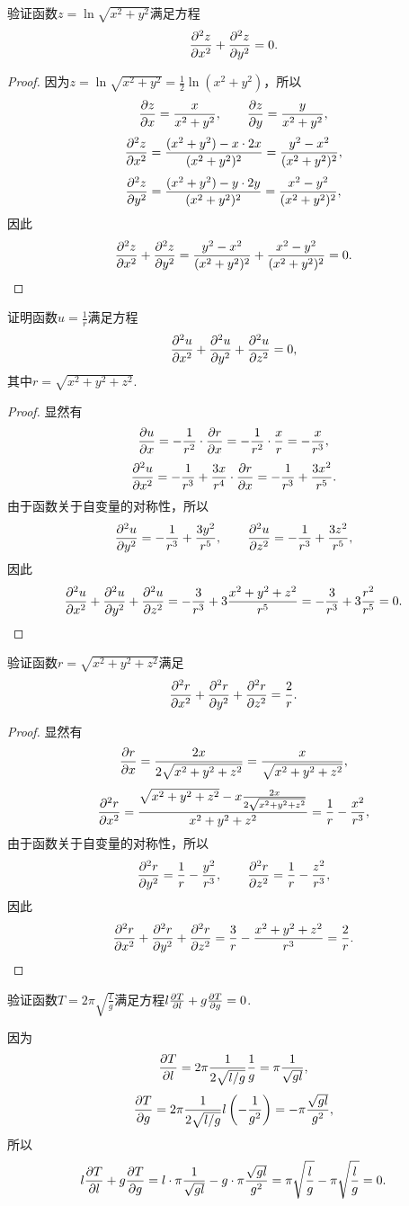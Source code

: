\begin{example}
验证函数\(z = \ln\sqrt{x^2+y^2}\)满足方程\[
\pdv[2]{z}{x} + \pdv[2]{z}{y} = 0.
\]
\begin{proof}
因为\(z = \ln\sqrt{x^2+y^2} = \frac{1}{2} \ln(x^2+y^2)\)，所以\[
\pdv{z}{x} = \frac{x}{x^2+y^2},
\qquad
\pdv{z}{y} = \frac{y}{x^2+y^2},
\]\[
\pdv[2]{z}{x} = \frac{(x^2+y^2)-x\cdot2x}{(x^2+y^2)^2}
= \frac{y^2-x^2}{(x^2+y^2)^2},
\]\[
\pdv[2]{z}{y} = \frac{(x^2+y^2)-y\cdot2y}{(x^2+y^2)^2}
= \frac{x^2-y^2}{(x^2+y^2)^2},
\]因此\[
\pdv[2]{z}{x} + \pdv[2]{z}{y}
= \frac{y^2-x^2}{(x^2+y^2)^2} + \frac{x^2-y^2}{(x^2+y^2)^2}
= 0.
\qedhere
\]
\end{proof}
\end{example}

\begin{example}
证明函数\(u = \frac{1}{r}\)满足方程\[
\pdv[2]{u}{x} + \pdv[2]{u}{y} + \pdv[2]{u}{z} = 0,
\]其中\(r = \sqrt{x^2+y^2+z^2}\).
\begin{proof}
显然有\[
\pdv{u}{x} = -\frac{1}{r^2}\cdot\pdv{r}{x}
= -\frac{1}{r^2}\cdot\frac{x}{r}
= -\frac{x}{r^3},
\]\[
\pdv[2]{u}{x} = -\frac{1}{r^3} + \frac{3x}{r^4}\cdot\pdv{r}{x}
= -\frac{1}{r^3} + \frac{3x^2}{r^5}.
\]由于函数关于自变量的对称性，所以\[
\pdv[2]{u}{y} = -\frac{1}{r^3} + \frac{3y^2}{r^5},
\qquad
\pdv[2]{u}{z} = -\frac{1}{r^3} + \frac{3z^2}{r^5},
\]因此\[
\pdv[2]{u}{x} + \pdv[2]{u}{y} + \pdv[2]{u}{z}
= -\frac{3}{r^3} + 3\frac{x^2+y^2+z^2}{r^5}
= -\frac{3}{r^3} + 3\frac{r^2}{r^5} = 0.
\qedhere
\]
\end{proof}
\end{example}

\begin{example}
验证函数\(r = \sqrt{x^2+y^2+z^2}\)满足\[
\pdv[2]{r}{x} + \pdv[2]{r}{y} + \pdv[2]{r}{z} = \frac{2}{r}.
\]
\begin{proof}
显然有\[
\pdv{r}{x} = \frac{2x}{2\sqrt{x^2+y^2+z^2}} = \frac{x}{\sqrt{x^2+y^2+z^2}},
\]\[
\pdv[2]{r}{x} = \frac{\sqrt{x^2+y^2+z^2}-x\frac{2x}{2\sqrt{x^2+y^2+z^2}}}{x^2+y^2+z^2}
= \frac{1}{r} - \frac{x^2}{r^3},
\]由于函数关于自变量的对称性，所以\[
\pdv[2]{r}{y} = \frac{1}{r} - \frac{y^2}{r^3},
\qquad
\pdv[2]{r}{z} = \frac{1}{r} - \frac{z^2}{r^3},
\]因此\[
\pdv[2]{r}{x} + \pdv[2]{r}{y} + \pdv[2]{r}{z}
= \frac{3}{r} - \frac{x^2+y^2+z^2}{r^3}
= \frac{2}{r}.
\qedhere
\]
\end{proof}
\end{example}

\begin{example}
验证函数\(T = 2\pi\sqrt{\frac{l}{g}}\)满足方程\(l\pdv{T}{l}+g\pdv{T}{g}=0\).
\begin{solution}
因为\[
\pdv{T}{l} = 2\pi \frac{1}{2\sqrt{l/g}} \frac{1}{g}
= \pi \frac{1}{\sqrt{gl}},
\]\[
\pdv{T}{g} = 2\pi \frac{1}{2\sqrt{l/g}} l \left(-\frac{1}{g^2}\right)
= -\pi \frac{\sqrt{gl}}{g^2},
\]所以\[
l\pdv{T}{l}+g\pdv{T}{g}
= l \cdot \pi \frac{1}{\sqrt{gl}} - g \cdot \pi \frac{\sqrt{gl}}{g^2}
= \pi \sqrt{\frac{l}{g}} - \pi \sqrt{\frac{l}{g}} = 0.
\]
\end{solution}
\end{example}

